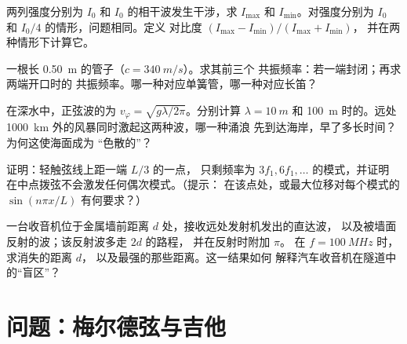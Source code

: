 \begin{exercise}[$\star\star$]\label{exo:b1:wave-propagation:8}
两列强度分别为 $I_0$ 和 $I_0$ 的相干波发生干涉，求
$I_{\max}$ 和 $I_{\min}$。对强度分别为 $I_0$ 和 $I_0/4$ 的情形，问题相同。定义
对比度 $(I_{\max} - I_{\min})/(I_{\max} + I_{\min})$，
并在两种情形下计算它。
\end{exercise}

\begin{exercise}[$\star\star$]\label{exo:b1:wave-propagation:9}
一根长 \qty{0.50}{m} 的管子（$c = \qty{340}{m/s}$）。求其前三个
共振频率：若一端封闭；再求两端开口时的
共振频率。哪一种对应单簧管，哪一种对应长笛？
\end{exercise}

\begin{exercise}[$\star\star\star$]\label{exo:b1:wave-propagation:10}
在深水中，正弦波的为
$v_\varphi = \sqrt{g\lambda/2\pi}$。分别计算 $\lambda = \qty{10}{m}$
和 \qty{100}{m} 时的。远处 \qty{1000}{km} 外的风暴同时激起这两种波，哪一种涌浪
先到达海岸，早了多长时间？为何这使海面成为
“色散的”？
\end{exercise}

\begin{exercise}[$\star\star\star$]\label{exo:b1:wave-propagation:11}
证明：轻触弦线上距一端 $L/3$ 的一点，
只剩频率为 $3f_1, 6f_1, \dots$ 的模式，并证明
在中点拨弦不会激发任何偶次模式。（提示：
在该点处，或最大位移对每个模式的
$\sin(n\pi x/L)$ 有何要求？）
\end{exercise}

\begin{exercise}[$\star\star\star$]\label{exo:b1:wave-propagation:12}
一台收音机位于金属墙前距离 $d$ 处，接收远处发射机发出的直达波，
以及被墙面反射的波；该反射波多走 $2d$ 的路程，
并在反射时附加 $\pi$。
在 $f = \qty{100}{MHz}$ 时，求消失的距离 $d$，
以及最强的那些距离。这一结果如何
解释汽车收音机在隧道中的“盲区”？
\end{exercise}

\section{问题：梅尔德弦与吉他}

